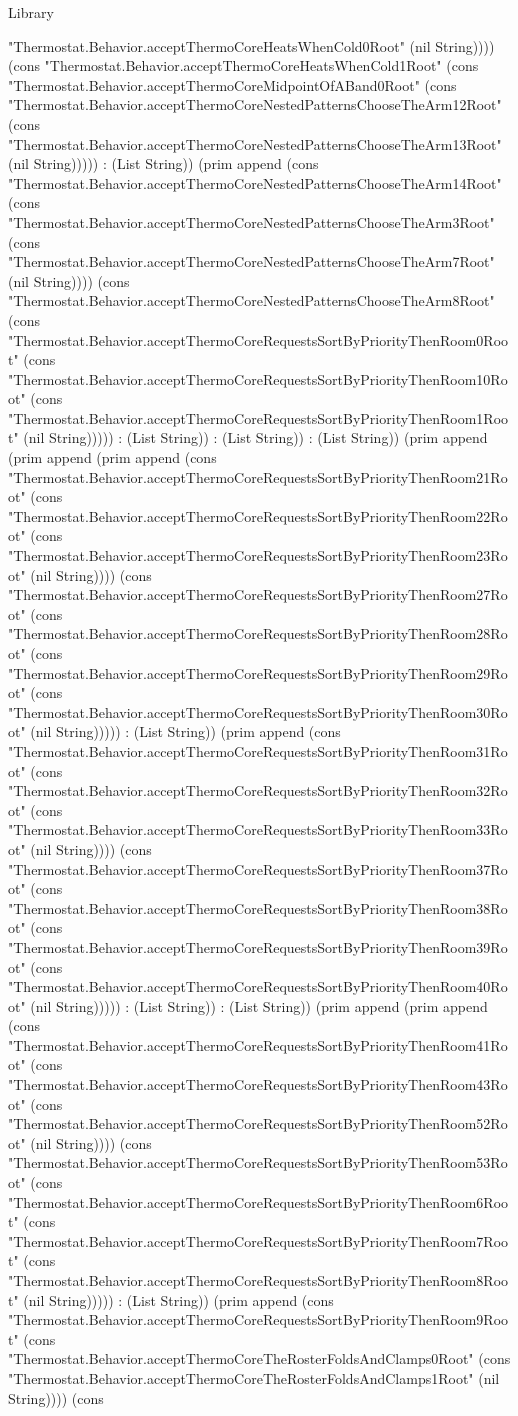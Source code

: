 \begin{lexlean}{Library}
\begin{semanticmodule}
{"Thermostat.Behavior.acceptThermoCoreHeatsWhenCold0Root" (nil String)))) (cons "Thermostat.Behavior.acceptThermoCoreHeatsWhenCold1Root" (cons "Thermostat.Behavior.acceptThermoCoreMidpointOfABand0Root" (cons "Thermostat.Behavior.acceptThermoCoreNestedPatternsChooseTheArm12Root" (cons "Thermostat.Behavior.acceptThermoCoreNestedPatternsChooseTheArm13Root" (nil String))))) : (List String)) (prim append (cons "Thermostat.Behavior.acceptThermoCoreNestedPatternsChooseTheArm14Root" (cons "Thermostat.Behavior.acceptThermoCoreNestedPatternsChooseTheArm3Root" (cons "Thermostat.Behavior.acceptThermoCoreNestedPatternsChooseTheArm7Root" (nil String)))) (cons "Thermostat.Behavior.acceptThermoCoreNestedPatternsChooseTheArm8Root" (cons "Thermostat.Behavior.acceptThermoCoreRequestsSortByPriorityThenRoom0Root" (cons "Thermostat.Behavior.acceptThermoCoreRequestsSortByPriorityThenRoom10Root" (cons "Thermostat.Behavior.acceptThermoCoreRequestsSortByPriorityThenRoom1Root" (nil String))))) : (List String)) : (List String)) : (List String)) (prim append (prim append (prim append (cons "Thermostat.Behavior.acceptThermoCoreRequestsSortByPriorityThenRoom21Root" (cons "Thermostat.Behavior.acceptThermoCoreRequestsSortByPriorityThenRoom22Root" (cons "Thermostat.Behavior.acceptThermoCoreRequestsSortByPriorityThenRoom23Root" (nil String)))) (cons "Thermostat.Behavior.acceptThermoCoreRequestsSortByPriorityThenRoom27Root" (cons "Thermostat.Behavior.acceptThermoCoreRequestsSortByPriorityThenRoom28Root" (cons "Thermostat.Behavior.acceptThermoCoreRequestsSortByPriorityThenRoom29Root" (cons "Thermostat.Behavior.acceptThermoCoreRequestsSortByPriorityThenRoom30Root" (nil String))))) : (List String)) (prim append (cons "Thermostat.Behavior.acceptThermoCoreRequestsSortByPriorityThenRoom31Root" (cons "Thermostat.Behavior.acceptThermoCoreRequestsSortByPriorityThenRoom32Root" (cons "Thermostat.Behavior.acceptThermoCoreRequestsSortByPriorityThenRoom33Root" (nil String)))) (cons "Thermostat.Behavior.acceptThermoCoreRequestsSortByPriorityThenRoom37Root" (cons "Thermostat.Behavior.acceptThermoCoreRequestsSortByPriorityThenRoom38Root" (cons "Thermostat.Behavior.acceptThermoCoreRequestsSortByPriorityThenRoom39Root" (cons "Thermostat.Behavior.acceptThermoCoreRequestsSortByPriorityThenRoom40Root" (nil String))))) : (List String)) : (List String)) (prim append (prim append (cons "Thermostat.Behavior.acceptThermoCoreRequestsSortByPriorityThenRoom41Root" (cons "Thermostat.Behavior.acceptThermoCoreRequestsSortByPriorityThenRoom43Root" (cons "Thermostat.Behavior.acceptThermoCoreRequestsSortByPriorityThenRoom52Root" (nil String)))) (cons "Thermostat.Behavior.acceptThermoCoreRequestsSortByPriorityThenRoom53Root" (cons "Thermostat.Behavior.acceptThermoCoreRequestsSortByPriorityThenRoom6Root" (cons "Thermostat.Behavior.acceptThermoCoreRequestsSortByPriorityThenRoom7Root" (cons "Thermostat.Behavior.acceptThermoCoreRequestsSortByPriorityThenRoom8Root" (nil String))))) : (List String)) (prim append (cons "Thermostat.Behavior.acceptThermoCoreRequestsSortByPriorityThenRoom9Root" (cons "Thermostat.Behavior.acceptThermoCoreTheRosterFoldsAndClamps0Root" (cons "Thermostat.Behavior.acceptThermoCoreTheRosterFoldsAndClamps1Root" (nil String)))) (cons }
\end{semanticmodule}
\end{lexlean}
